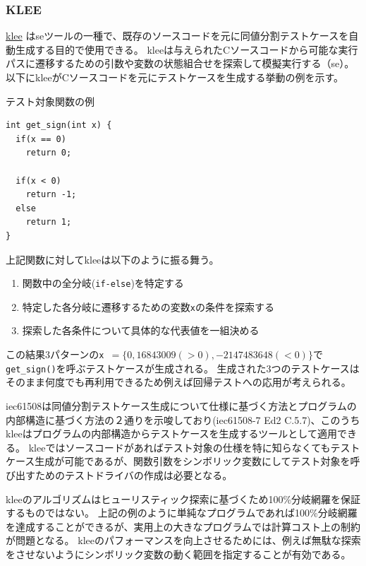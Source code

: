 \subsubsection{KLEE}
\label{klee}
\href{https://klee.github.io/}{\acrshort{klee}} \cite{klee}は\acrshort{se}ツールの一種で、既存のソースコードを元に同値分割テストケースを自動生成する目的で使用できる。
\acrshort{klee}は与えられたCソースコードから可能な実行パスに遷移するための引数や変数の状態組合せを探索して模擬実行する（\acrshort{se}）。
以下に\acrshort{klee}がCソースコードを元にテストケースを生成する挙動の例を示す。
\begin{itembox}[l]{テスト対象関数の例}
\begin{verbatim}
int get_sign(int x) {
  if(x == 0)
    return 0;

  if(x < 0)
    return -1;
  else
    return 1;
}
\end{verbatim}
\end{itembox}
\par
上記関数に対して\acrshort{klee}は以下のように振る舞う。
\begin{enumerate}
  \item 関数中の全分岐(\verb|if-else|)を特定する
  \item 特定した各分岐に遷移するための変数\verb|x|の条件を探索する
  \item 探索した各条件について具体的な代表値を一組決める
\end{enumerate}
\par
この結果3パターンの\verb|x |$ = \{0, 16843009 (> 0), -2147483648 (< 0)\}$で\verb|get_sign()|を呼ぶテストケースが生成される。
生成された3つのテストケースはそのまま何度でも再利用できるため例えば回帰テストへの応用が考えられる。
\par
\acrshort{iec61508}は同値分割テストケース生成について仕様に基づく方法とプログラムの内部構造に基づく方法の２通りを示唆しており(\acrshort{iec61508}-7 Ed2 C.5.7)、このうち\acrshort{klee}はプログラムの内部構造からテストケースを生成するツールとして適用できる。
\acrshort{klee}ではソースコードがあればテスト対象の仕様を特に知らなくてもテストケース生成が可能であるが、関数引数をシンボリック変数にしてテスト対象を呼び出すためのテストドライバの作成は必要となる。
\par
\acrshort{klee}のアルゴリズムはヒューリスティック探索に基づくため100\%分岐網羅を保証するものではない。
上記の例のように単純なプログラムであれば100\%分岐網羅を達成することができるが、実用上の大きなプログラムでは計算コスト上の制約が問題となる。
\acrshort{klee}のパフォーマンスを向上させるためには、例えば無駄な探索をさせないようにシンボリック変数の動く範囲を指定することが有効である。
